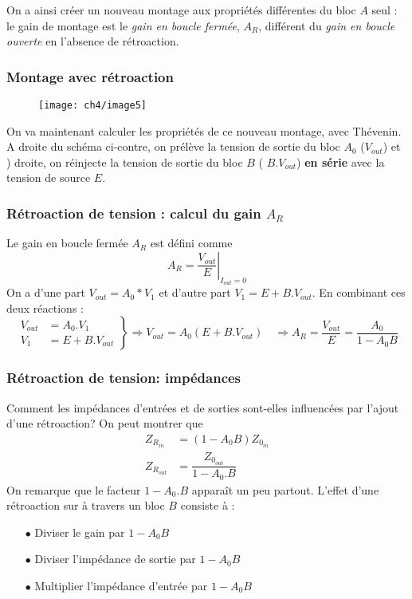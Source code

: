 		On a ainsi créer un nouveau montage aux propriétés différentes 
		du bloc $A$ seul : le gain de montage est le \textit{gain en 
		boucle fermée}, $A_R$, différent du \textit{gain en boucle 
		ouverte} en l'absence de rétroaction.
		
		\subsubsection{Montage avec rétroaction}
		\begin{wrapfigure}[4]{r}{5cm}
		\vspace{-7mm}
		\texttt{[image: ch4/image5]}
		\end{wrapfigure}
		On va maintenant calculer les propriétés de ce nouveau 
		montage, avec Thévenin. A droite du schéma ci-contre, on 
		prélève la tension de sortie du bloc $A_0$ ($V_{out}$) et ) 
		droite, on réinjecte la tension de sortie du bloc $B$ (
		$B.V_{out}$) \textbf{en série} avec la tension de source $E$.
		
		\subsubsection{Rétroaction de tension : calcul du gain $A_R$}
		Le gain en boucle fermée $A_R$ est défini comme
		\begin{equation}
		A_R = \left.\dfrac{V_{out}}{E}\right|_{I_{out}=0} 
		\end{equation}
		On a d'une part $V_{out} = A_0*V_1$ et d'autre part $V_1 = 
		E+B.V_{out}$. En combinant ces deux réactions : 
		\begin{equation}
		\left. \begin{array}{ll}
		V_{out} &= A_0.V_1\\
		V_1 &= E+B.V_{out}
		\end{array}\right\}\Rightarrow V_{out} = A_0(E+B.V_{out})\quad 
		\Longrightarrow A_R = \dfrac{V_{out}}{E}=\dfrac{A_0}{1-A_0B}
		\end{equation}
		
		\subsubsection{Rétroaction de tension: impédances}
		Comment les impédances d'entrées et de sorties sont-elles 
		influencées par l'ajout d'une rétroaction? On peut montrer que 
		\begin{equation}
		\begin{array}{ll}
		Z_{R_{in}} &= (1-A_0B)Z_{0_{in}}\\
		Z_{R_{out}} &= \dfrac{Z_{0_{out}}}{1-A_0.B}
		\end{array}
		\end{equation}
		On remarque que le facteur $1-A_0.B$ apparaît un peu partout. 
		L'effet d'une rétroaction sur à travers un bloc $B$ consiste à :
		\begin{itemize}
		\item[$\bullet$] Diviser le gain par $1-A_0B$
		\item[$\bullet$] Diviser l'impédance de sortie par $1-A_0B$
		\item[$\bullet$] Multiplier l'impédance d'entrée par $1-A_0B$
		\end{itemize}
		
